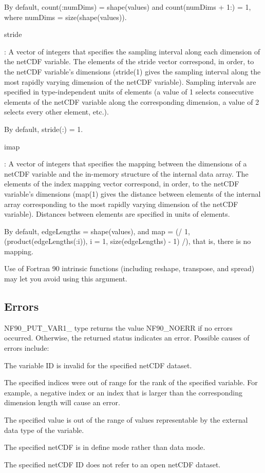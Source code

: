 By default, count(\+:num\+Dims) = shape(values) and count(num\+Dims + 1\+:) = 1, where num\+Dims = size(shape(values)).

{\ttfamily stride}

\+: A vector of integers that specifies the sampling interval along each dimension of the net\+C\+DF variable. The elements of the stride vector correspond, in order, to the net\+C\+DF variable’s dimensions (stride(1) gives the sampling interval along the most rapidly varying dimension of the net\+C\+DF variable). Sampling intervals are specified in type-\/independent units of elements (a value of 1 selects consecutive elements of the net\+C\+DF variable along the corresponding dimension, a value of 2 selects every other element, etc.).

By default, stride(\+:) = 1.

{\ttfamily imap}

\+: A vector of integers that specifies the mapping between the dimensions of a net\+C\+DF variable and the in-\/memory structure of the internal data array. The elements of the index mapping vector correspond, in order, to the net\+C\+DF variable’s dimensions (map(1) gives the distance between elements of the internal array corresponding to the most rapidly varying dimension of the net\+C\+DF variable). Distances between elements are specified in units of elements.

By default, edge\+Lengths = shape(values), and map = (/ 1, (product(edge\+Lengths(\+:i)), i = 1, size(edge\+Lengths) -\/ 1) /), that is, there is no mapping.

Use of Fortran 90 intrinsic functions (including reshape, transpose, and spread) may let you avoid using this argument.

\subsection*{Errors}

N\+F90\+\_\+\+P\+U\+T\+\_\+\+V\+A\+R1\+\_\+ type returns the value N\+F90\+\_\+\+N\+O\+E\+RR if no errors occurred. Otherwise, the returned status indicates an error. Possible causes of errors include\+:


\begin{DoxyItemize}
\item The variable ID is invalid for the specified net\+C\+DF dataset.
\item The specified indices were out of range for the rank of the specified variable. For example, a negative index or an index that is larger than the corresponding dimension length will cause an error.
\item The specified value is out of the range of values representable by the external data type of the variable.
\item The specified net\+C\+DF is in define mode rather than data mode.
\item The specified net\+C\+DF ID does not refer to an open net\+C\+DF dataset.
\end{DoxyItemize}

